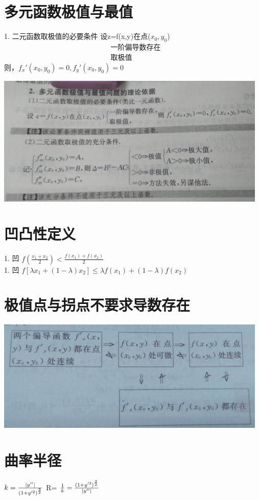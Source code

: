 \documentclass[UTF8]{ctexart}
\begin{document}
\section{多元函数极值与最值}
1. 二元函数取极值的必要条件
设z=f(x,y)在点($x_0,y_0$) \\
\begin{align}
&\mbox{一阶偏导数存在}\\
&\mbox{取极值}
\end{align}则，$ f_x' (x_0 , y_0)=0 , f_y' (x_0 , y_0)=0 $

\includegraphics[width=13cm]{9345E7/2805530637.jpg}

\section{凹凸性定义}
    1. 凹  $ f(\frac{x_1+x_2}{2}) < \frac{f(x_1)+f(x_2)}{2}$   \\
    1. 凹  $ f[λx_1 +(1-λ)x_2] \leq λf(x_1)+(1-λ)f(x_2)$  \\

\section{极值点与拐点不要求导数存在}
\includegraphics[width=13cm]{9345E7/2367085874.jpg}

\section{曲率半径}
$ k= \frac{|y''|}{{(1+y'^2)}^{3 \over 2}}$
R= $ \frac{1}{k}=\frac{{(1+y'^2)}^{3 \over 2}}{|y''|}$
\end{document}
